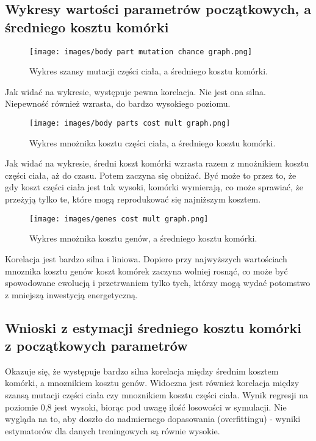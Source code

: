 \documentclass{article}
\begin{document}
\subsection{Wykresy wartości parametrów początkowych, a średniego kosztu komórki}

\begin{figure}[H]
    \centering
    \texttt{[image: images/body part mutation chance graph.png]}
    \caption{Wykres szansy mutacji części ciała, a średniego kosztu komórki.}
    \label{fig:mutation-chance1}
\end{figure}

Jak widać na wykresie, występuje pewna korelacja. Nie jest ona silna. Niepewność również wzrasta, do bardzo wysokiego poziomu.

\begin{figure}[H]
    \centering
    \texttt{[image: images/body parts cost mult graph.png]}
    \caption{Wykres mnożnika kosztu części ciała, a średniego kosztu komórki.}
    \label{fig:body-cost-mult1}
\end{figure}

Jak widać na wykresie, średni koszt komórki wzrasta razem z mnożnikiem kosztu części ciała, aż do czasu. Potem zaczyna się obniżać. Być może to przez to, że gdy koszt części ciała jest tak wysoki, komórki wymierają, co może sprawiać, że przeżyją tylko te, które mogą reprodukować się najniższym kosztem.

\begin{figure}[H]
    \centering
    \texttt{[image: images/genes cost mult graph.png]}
    \caption{Wykres mnożnika kosztu genów, a średniego kosztu komórki.}
    \label{fig:gene-cost-mult1}
\end{figure}

Korelacja jest bardzo silna i liniowa. Dopiero przy najwyższych wartościach mnoznika kosztu genów koszt komórek zaczyna wolniej rosnąć, co może być spowodowane ewolucją i przetrwaniem tylko tych, którzy mogą wydać potomstwo z mniejszą inwestycją energetyczną.

\subsection{Wnioski z estymacji średniego kosztu komórki z początkowych parametrów}

Okazuje się, że występuje bardzo silna korelacja między średnim kosztem komórki, a mnoznikiem kosztu genów. Widoczna jest również korelacja między szansą mutacji części ciała czy mnoznikiem kosztu części ciała. Wynik regresji na poziomie 0,8 jest wysoki, biorąc pod uwagę ilość losowości w symulacji. Nie wygląda na to, aby doszło do nadmiernego dopasowania (overfittingu) - wyniki estymatorów dla danych treningowych są równie wysokie.
\end{document}
